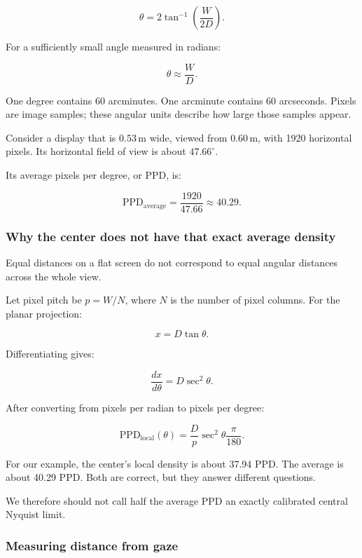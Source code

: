 \[
\theta=2\tan^{-1}\left(\frac{W}{2D}\right).
\]

For a sufficiently small angle measured in radians:

\[
\theta\approx\frac{W}{D}.
\]

One degree contains 60 arcminutes. One arcminute contains 60 arcseconds. Pixels are image samples; these angular units describe how large those samples appear.

Consider a display that is \(0.53\,\mathrm{m}\) wide, viewed from \(0.60\,\mathrm{m}\), with 1920 horizontal pixels. Its horizontal field of view is about \(47.66^\circ\).

Its average pixels per degree, or PPD, is:

\[
\mathrm{PPD}_{\mathrm{average}}
=\frac{1920}{47.66}
\approx40.29.
\]

\subsubsection{Why the center does not have that exact average density}\label{04-visual-computing-ii-ch043-why-the-center-does-not-have-that-exact-average-density}

\hypertarget{04-visual-computing-ii-ch043-why-the-center-does-not-have-that-exact-average-density}{}

Equal distances on a flat screen do not correspond to equal angular distances across the whole view.

Let pixel pitch be \(p=W/N\), where \(N\) is the number of pixel columns. For the planar projection:

\[
x=D\tan\theta.
\]

Differentiating gives:

\[
\frac{dx}{d\theta}=D\sec^2\theta.
\]

After converting from pixels per radian to pixels per degree:

\[
\mathrm{PPD}_{\mathrm{local}}(\theta)
=\frac{D}{p}\sec^2\theta\frac{\pi}{180}.
\]

For our example, the center's local density is about 37.94 PPD. The average is about 40.29 PPD. Both are correct, but they answer different questions.

We therefore should not call half the average PPD an exactly calibrated central Nyquist limit.

\subsubsection{Measuring distance from gaze}\label{04-visual-computing-ii-ch043-measuring-distance-from-gaze}


